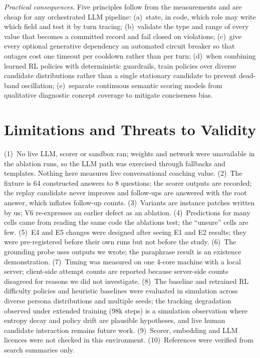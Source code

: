 \documentclass[runningheads]{llncs}
\begin{document}
\emph{Practical consequences.} Five principles follow from the measurements and are cheap for any orchestrated LLM pipeline: (a)~state, in code, which role may write which field and test it by turn tracing; (b)~validate the type and range of every value that becomes a committed record and fail closed on violations; (c)~give every optional generative dependency an automated circuit breaker so that outages cost one timeout per cooldown rather than per turn; (d)~when combining learned RL policies with deterministic guardrails, train policies over diverse candidate distributions rather than a single stationary candidate to prevent dead-band oscillation; (e)~separate continuous semantic scoring models from qualitative diagnostic concept coverage to mitigate conciseness bias.

\section{Limitations and Threats to Validity}\label{sec:limits}
(1)~No live LLM, scorer or sandbox ran; weights and network were unavailable in the ablation runs, so the LLM path was exercised through fallbacks and templates. Nothing here measures live conversational coaching value. (2)~The fixture is 64 constructed answers to 8 questions; the scorer outputs are recorded; the replay candidate never improves and follow-ups are answered with the root answer, which inflates follow-up counts. (3)~Variants are instance patches written by us; V6 re-expresses an earlier defect as an ablation. (4)~Predictions for many cells came from reading the same code the ablations test; the ``unsure'' cells are few. (5)~E4 and E5 changes were designed after seeing E1 and E2 results; they were pre-registered before their own runs but not before the study. (6)~The grounding probe uses outputs we wrote; the paraphrase result is an existence demonstration. (7)~Timing was measured on one 4-core machine with a local server; client-side attempt counts are reported because server-side counts disagreed for reasons we did not investigate. (8)~The baseline and retrained RL difficulty policies and heuristic baselines were evaluated in simulation across diverse persona distributions and multiple seeds; the tracking degradation observed under extended training (98k steps) is a simulation observation where entropy decay and policy drift are plausible hypotheses, and live human candidate interaction remains future work. (9)~Scorer, embedding and LLM licences were not checked in this environment. (10)~References were verified from search summaries only.
\end{document}
